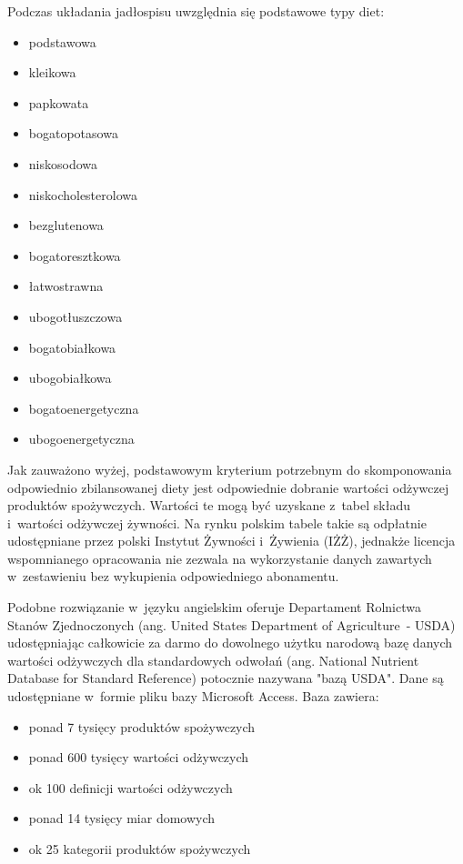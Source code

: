\par
Podczas układania jadłospisu uwzględnia się podstawowe typy diet\cite{book:dietoterapia}:
\begin{itemize}
    \item podstawowa
    \item kleikowa
    \item papkowata
    \item bogatopotasowa
    \item niskosodowa
    \item niskocholesterolowa
    \item bezglutenowa
    \item bogatoresztkowa
    \item łatwostrawna
    \item ubogotłuszczowa
    \item bogatobiałkowa
    \item ubogobiałkowa
    \item bogatoenergetyczna
    \item ubogoenergetyczna
\end{itemize}

\par
Jak zauważono wyżej, podstawowym kryterium potrzebnym do skomponowania odpowiednio zbilansowanej diety jest odpowiednie dobranie wartości odżywczej produktów spożywczych.
Wartości te mogą być uzyskane z~tabel składu i~wartości odżywczej żywności.
Na rynku polskim tabele takie są odpłatnie udostępniane przez polski Instytut Żywności i~Żywienia (IŻŻ)\cite{book:tabele-wartosci-odzywczych},
jednakże licencja wspomnianego opracowania nie zezwala na wykorzystanie danych zawartych w~zestawieniu bez wykupienia odpowiedniego abonamentu\cite{url:izz-dostep-do-bazy}.

\par
Podobne rozwiązanie w~języku angielskim oferuje Departament Rolnictwa Stanów Zjednoczonych (ang. United States Department of Agriculture~- USDA) udostępniając całkowicie za darmo
do dowolnego użytku narodową bazę danych wartości odżywczych dla standardowych odwołań (ang. National Nutrient Database for Standard Reference)\cite{url:usda-sr-db} potocznie nazywana "bazą USDA".
Dane są udostępniane w~formie pliku bazy Microsoft Access. Baza zawiera:
\begin{itemize}
    \item ponad 7 tysięcy produktów spożywczych
    \item ponad 600 tysięcy wartości odżywczych
    \item ok 100 definicji wartości odżywczych
    \item ponad 14 tysięcy miar domowych
    \item ok 25 kategorii produktów spożywczych
\end{itemize}

